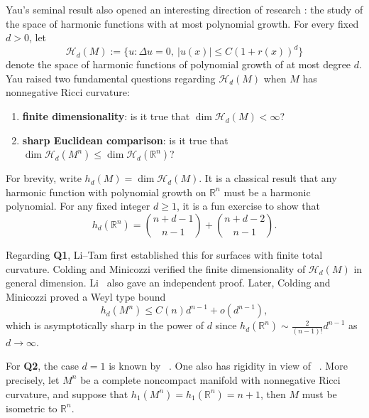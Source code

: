 \documentclass[12pt]{amsart}
\theoremstyle{plain}
\theoremstyle{definition}
\theoremstyle{remark}     %
\numberwithin{equation}{section}
\begin{document}
Yau's seminal result also opened an interesting direction of research : the study of the space of harmonic functions with at most polynomial growth.  
For every fixed $d>0$, let
\[
\mathcal{H}_d(M):=\{u:\Delta u=0,\ |u(x)|\leq C(1+r(x))^d\}
\]
denote the space of harmonic functions of polynomial growth of at most degree $d$. Yau raised two fundamental questions regarding $\mathcal{H}_d(M)$ when $M$ has nonnegative Ricci curvature: 
\begin{enumerate}
    \item[Q1] {\bf finite dimensionality}: is it true that $\dim \mathcal{H}_d(M)<\infty$?
    \item[Q2] 
{\bf sharp Euclidean comparison}: is it true that $\dim \mathcal{H}_d(M^n)\le \dim \mathcal{H}_d(\mathbb R^n)$?
\end{enumerate}

For brevity, write $h_d(M)=\dim \mathcal{H}_d(M)$. It is a classical result that any harmonic function with polynomial growth on $\mathbb{R}^n$ must be a harmonic polynomial. For any fixed integer $d\ge1$, it is a fun exercise to show that 
\[
h_d(\mathbb R^n)=\binom{n+d-1}{n-1}+
\binom{n+d-2}{n-1}.
\]

Regarding {\bf Q1}, Li--Tam \cite{LT2} first established this for surfaces with finite total curvature. Colding and Minicozzi \cite{CM1} verified the finite dimensionality of $\mathcal{H}_d(M)$ in general dimension. Li~\cite{L1} also gave an independent proof. 
Later, Colding and Minicozzi \cite{CM2} proved a Weyl type bound 
\[
h_d(M^n)\le C(n)d^{n-1}+ o(d^{n-1}),
\]
which is asymptotically sharp in the power of $d$ since 
$h_d(\mathbb{R}^n)\sim \frac{2}{(n-1)!} d^{n-1}$ as $d\to \infty$. 

For {\bf Q2}, the case $d=1$ is known by ~\cite{LT1}. One also has rigidity in view of ~\cite{CCM}. More precisely, let $M^n$ be a complete noncompact manifold with nonnegative Ricci curvature, and suppose that $h_1(M^n)=h_1(\mathbb{R}^n)=n+1$, then $M$ must be isometric to $\mathbb{R}^n$. 
\end{document}

